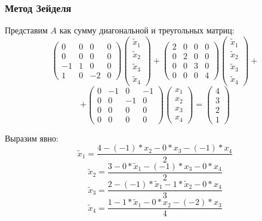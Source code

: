 \documentclass[10pt]{beamer}
\begin{document}
\begin{frame}[fragile]
\frametitle{Метод Зейделя}
Представим $A$ как сумму диагональной и треугольных матриц:
$$
\begin{pmatrix}
0 & 0 & 0 & 0 \\
0 & 0 & 0 & 0 \\
-1 & 1 & 0 & 0 \\
1 & 0 & -2 & 0 
\end{pmatrix}
\begin{pmatrix}
\tilde{x}_1 \\
\tilde{x}_2 \\
\tilde{x}_3 \\
\tilde{x}_4
\end{pmatrix}
+
\begin{pmatrix}
2 & 0 & 0 & 0 \\
0 & 2 & 0 & 0 \\
0 & 0 & 3 & 0 \\
0 & 0 & 0 & 4 
\end{pmatrix}
\begin{pmatrix}
\tilde{x}_1 \\
\tilde{x}_2 \\
\tilde{x}_3 \\
\tilde{x}_4
\end{pmatrix}
+$$
$$
+
\begin{pmatrix}
0 & -1 & 0 & -1 \\
0 & 0 & -1 & 0 \\
0 & 0 & 0 & 0 \\
0 & 0 & 0 & 0 
\end{pmatrix}
\begin{pmatrix}
x_1 \\
x_2 \\
x_3 \\
x_4
\end{pmatrix}
=
\begin{pmatrix}
4 \\
3 \\
2 \\
1
\end{pmatrix}
$$

Выразим явно:
$$\tilde{x}_1 = \frac{ 4 - (-1) * x_2 - 0 * x_3 - (-1) * x_4 }{2} $$
$$\tilde{x}_2 = \frac{ 3 - 0 * \tilde{x}_1 - (-1) * x_3 - 0 * x_4 }{2} $$
$$\tilde{x}_3 = \frac{ 2 - (-1) * \tilde{x}_1 - 1 * \tilde{x}_2 - 0 * x_4 }{3} $$
$$\tilde{x}_4 = \frac{ 1 - 1 * \tilde{x}_1 - 0 * x_2 - (-2) * x_3 }{4} $$
\end{frame}
\end{document}
